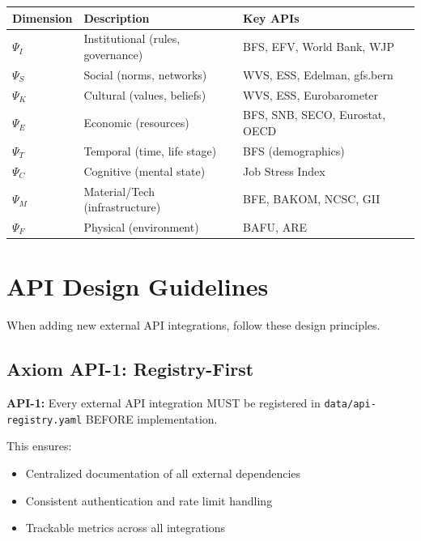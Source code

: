\begin{center}
\begin{tabular}{lll}
\toprule
\textbf{Dimension} & \textbf{Description} & \textbf{Key APIs} \\
\midrule
$\Psi_I$ & Institutional (rules, governance) & BFS, EFV, World Bank, WJP \\
$\Psi_S$ & Social (norms, networks) & WVS, ESS, Edelman, gfs.bern \\
$\Psi_K$ & Cultural (values, beliefs) & WVS, ESS, Eurobarometer \\
$\Psi_E$ & Economic (resources) & BFS, SNB, SECO, Eurostat, OECD \\
$\Psi_T$ & Temporal (time, life stage) & BFS (demographics) \\
$\Psi_C$ & Cognitive (mental state) & Job Stress Index \\
$\Psi_M$ & Material/Tech (infrastructure) & BFE, BAKOM, NCSC, GII \\
$\Psi_F$ & Physical (environment) & BAFU, ARE \\
\bottomrule
\end{tabular}
\end{center}

\section{API Design Guidelines}
\label{sec:api-design}

When adding new external API integrations, follow these design principles.

\subsection{Axiom API-1: Registry-First}

\begin{tcolorbox}[colback=blue!5, colframe=blue!50]
\textbf{API-1:} Every external API integration MUST be registered in \texttt{data/api-registry.yaml} BEFORE implementation.
\end{tcolorbox}

This ensures:
\begin{itemize}
    \item Centralized documentation of all external dependencies
    \item Consistent authentication and rate limit handling
    \item Trackable metrics across all integrations
\end{itemize}

